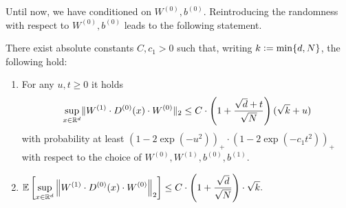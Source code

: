 Until now, we have conditioned on $W^{(0)}, b^{(0)}$. Reintroducing the randomness with respect to $W^{(0)}, b^{(0)}$ leads to the following statement.
\begin{proposition} \label{thm:pre_main}
There exist absolute constants $C, c_1 > 0$ such that, writing $k \mathrel{\mathop:}= \min\{d,N\}$, the following hold:
\begin{enumerate}
\item{ \label{item1:pre_main}
For any $u,t \geq 0$ it holds
\begin{equation*}
\underset{x \in \mathbb{R}^d}{\sup} \Vert W^{(1)} \cdot D^{(0)}(x) \cdot W^{(0)}\Vert_2 \leq C\cdot \left(1 + \frac{\sqrt{d} + t}{\sqrt{N}}\right)(\sqrt{k} + u)
\end{equation*}
with probability at least $(1-2\exp(-u^2))_+ \cdot (1-2\exp(-c_1t^2))_+$ with respect to the choice of $W^{(0)}, W^{(1)}, b^{(0)}, b^{(1)}$.
}
\item{ \label{item2:pre_main}
$ \displaystyle
\mathbb{E} \left[ \underset{x \in \mathbb{R}^d}{\sup} \left\Vert W^{(1)} \cdot D^{(0)}(x) \cdot W^{(0)}\right\Vert_2\right] \leq C \cdot \left(1+ \frac{\sqrt{d} }{\sqrt{N}} \right) \cdot \sqrt{k}.
$
}
\end{enumerate}
\end{proposition}
